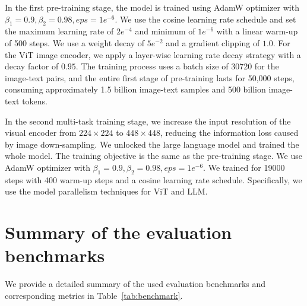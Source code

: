\documentclass{article}
\begin{document}
In the first pre-training stage, the model is trained using AdamW optimizer with $\beta_{1}=0.9, \beta_{2}=0.98, eps=1e^{-6}$. We use the cosine learning rate schedule and set the maximum learning rate of $2e^{-4}$ and minimum of $1e^{-6}$ with a linear warm-up of 500 steps. We use a weight decay of $5e^{-2}$ and a gradient clipping of $1.0$. For the ViT image encoder, we apply a layer-wise learning rate decay strategy with a decay factor of $0.95$. 
The training process uses a batch size of 30720 for the image-text pairs, and the entire first stage of pre-training lasts for 50,000 steps, consuming approximately 1.5 billion image-text samples and 500 billion image-text tokens.

In the second multi-task training stage, we increase the input resolution of the visual encoder from $224\times 224$ to $448\times 448$, reducing the information loss caused by image down-sampling. We unlocked the large language model and trained the whole model. The training objective is the same as the pre-training stage. We use AdamW optimizer with $\beta_{1}=0.9, \beta_{2}=0.98, eps=1e^{-6}$. We trained for 19000 steps with 400 warm-up steps and a cosine learning rate schedule. Specifically, we use the model parallelism techniques for ViT and LLM.

\section{Summary of the evaluation benchmarks}
\label{app:benchmark}

We provide a detailed summary of the used evaluation benchmarks and corresponding metrics in Table~\ref{tab:benchmark}.
\end{document}
